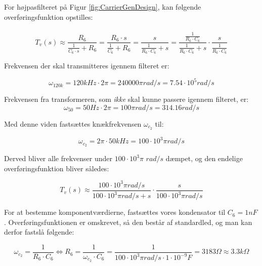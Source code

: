 For højpasfilteret på Figur \ref{fig:CarrierGenDesign}, kan følgende overføringsfunktion opstilles:\\\\
\begin{displaymath}
T_{v}(s)\approx
\dfrac{R_{6}}{\tfrac{1}{C_{6}\cdot s}+R_{6}}=
\dfrac{R_{6} \cdot s}{\tfrac{1}{C_{6}} + R_{6} }=
\dfrac{s}{ \tfrac{1}{R_{6} \cdot C_{6}}+s }=
\dfrac{\tfrac{1}{R_{6}\cdot C_{6}}}{\tfrac{1}{R_{6}\cdot C_{6}}+s} \cdot \dfrac{s}{\tfrac{1}{R_{6}\cdot C_{6}}}
\end{displaymath}

Frekvensen der skal transmitteres igennem filteret er:

\begin{displaymath}
\omega_{120k} = 120kHz\cdot 2 \pi = 240000 \pi rad/s = 7.54\cdot 10^{5} rad/s
\end{displaymath}

Frekvensen fra transformeren, som \textit{ikke} skal kunne passere igennem filteret, er:
\begin{displaymath}
\omega_{50} = 50Hz\cdot 2 \pi = 100 \pi rad/s = 314.16 rad/s
\end{displaymath}

Med denne viden fastsættes knækfrekvensen $\omega_{c_{2}}$ til:

\begin{displaymath}
\omega_{c_{2}}= 2\pi \cdot 50kHz = 100\cdot 10^{3}\pi rad/s
\end{displaymath}

Derved bliver alle frekvenser under $100\cdot 10^{3}\pi$ $rad/s$ dæmpet, og den endelige overføringsfunktion bliver således:

\begin{displaymath}
T_{v}(s)\approx 
\dfrac{100\cdot 10^{3}\pi rad/s}{100\cdot 10^{3}\pi rad/s +s} \cdot \dfrac{s}{100\cdot 10^{3}\pi rad/s}
\end{displaymath}

For at bestemme komponentværdierne, fastsættes vores kondensator til $C_{6} = 1nF$. Overføringsfunktionen er omskrevet, så den består af standardled, og man kan derfor fastslå følgende:

\begin{displaymath}
\omega_{c_{2}} = \dfrac{1}{R_{6} \cdot C_{6}} \Leftrightarrow
R_{6} = \dfrac{1}{\omega_{c_{2}} \cdot C_{6}} = \dfrac{1}{100\cdot 10^{3}\pi rad/s \cdot 1\cdot 10^{-9}F} = 3183 \Omega \approx 3.3k \Omega
\end{displaymath}

